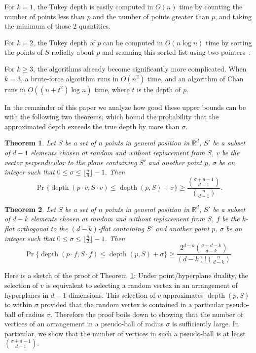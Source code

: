 \documentclass [letterpaper] {article}
\newtheorem{theorem}{Theorem}%
\DeclareMathOperator{\depth}{depth}
\begin{document}
For $k = 1$, the Tukey depth is easily computed in $O(n)$ time by counting the number of points less than $p$ and the number of points greater than $p$, and taking the minimum of those $2$ quantities.

For $k = 2$, the Tukey depth of $p$ can be computed in $O(n\log n)$ time by sorting the points of $S$ radially about $p$ and scanning this sorted list using two pointers~\cite{Rousseeuw98}.

For $k \geq 3$, the algorithms already become significantly more complicated. When $k = 3$, a brute-force algorithm runs in $O(n^{2})$ time, and an algorithm of Chan~\cite{Chan05} runs in $O((n + t^{2})\log n)$ time, where $t$ is the depth of $p$.

In the remainder of this paper we analyze how good these upper bounds can be with the following two theorems, which bound the probability that the approximated depth exceeds the true depth by more than $\sigma$.
\begin{theorem}
\label{thm:ballofvertices}
  Let $S$ be a set of $n$ points in general position in $\mathbb{R}^{d}$, $S'$ be a subset of $d-1$ elements chosen at random and without replacement from $S$, $v$ be the vector perpendicular to the plane containing $S'$ and another point $p$, $\sigma$ be an integer such that $0 \leq \sigma \leq \lfloor \frac{n}{d}\rfloor - 1$. Then
\[ \Pr\{ \depth{(p \cdot v, S \cdot v)} \leq \depth{(p, S)} + \sigma \} \geq \frac{\binom{\sigma+d-1}{d-1}}{\binom{n}{d-1}}.\]
\end{theorem}
\begin{theorem}
\label{thm:ballofflats}
  Let $S$ be a set of $n$ points in general position in $\mathbb{R}^{d}$, $S'$ be a subset of $d-k$ elements chosen at random and without replacement from $S$, $f$ be the $k$-flat orthogonal to the $(d - k)$-flat containing $S'$ and another point $p$, $\sigma$ be an integer such that $0 \leq \sigma \leq \lfloor \frac{n}{2}\rfloor - 1$. Then
\[ \Pr\{ \depth{(p \cdot f, S \cdot f)} \leq \depth{(p, S)} + \sigma \} \geq \frac{2^{d-k}\binom{\sigma + d-k}{d-k}}{(d-k)!\binom{n}{d-k}}.\]
\end{theorem}

Here is a sketch of the proof of Theorem~\ref{thm:ballofvertices}:  Under
point/hyperplane duality, the selection of $v$ is equivalent to selecting
a random vertex in an arrangement of hyperplanes in $d-1$ dimensions.
This selection of $v$ approximates $\depth{(p, S)}$ to within $\sigma$
provided that the random vertex is contained in a particular pseudo-ball
of radius $\sigma$. Therefore the proof boils down to showing that the
number of vertices of an arrangement in a pseudo-ball of radius $\sigma$
is sufficiently large. In particular, we show that the number of vertices
in such a pseudo-ball is at least $\binom{\sigma+d-1}{d-1}$.
\end{document}
